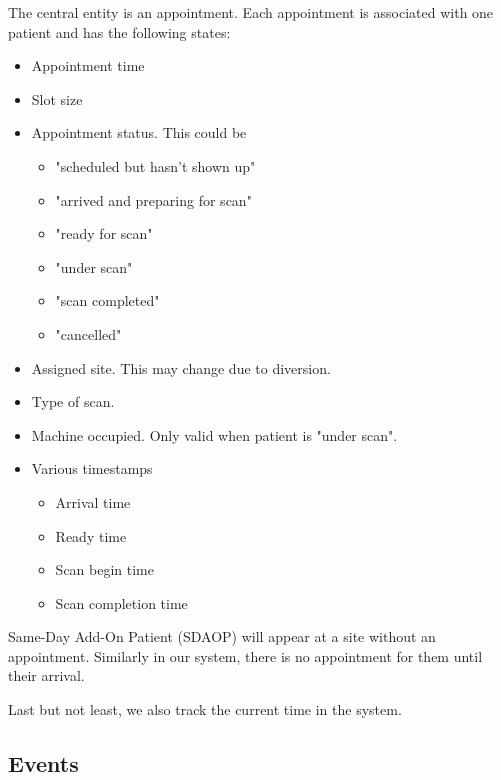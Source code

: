 The central entity is an appointment. Each appointment is associated
with one patient and has the following states:
\begin{itemize}
\item Appointment time
\item Slot size
\item Appointment status. This could be
  \begin{itemize}
  \item "scheduled but hasn't shown up"
  \item "arrived and preparing for scan"
  \item "ready for scan"
  \item "under scan"
  \item "scan completed"
  \item "cancelled"
  \end{itemize}
\item Assigned site. This may change due to diversion.
\item Type of scan.
\item Machine occupied. Only valid when patient is "under scan".
\item Various timestamps
  \begin{itemize}
  \item Arrival time
  \item Ready time
  \item Scan begin time
  \item Scan completion time
  \end{itemize}
\end{itemize}
Same-Day Add-On Patient (SDAOP) will appear at
a site without an appointment. Similarly in our system, there is no
appointment for them until their arrival.

Last but not least, we also track the current time in the system.


\subsection{Events}

